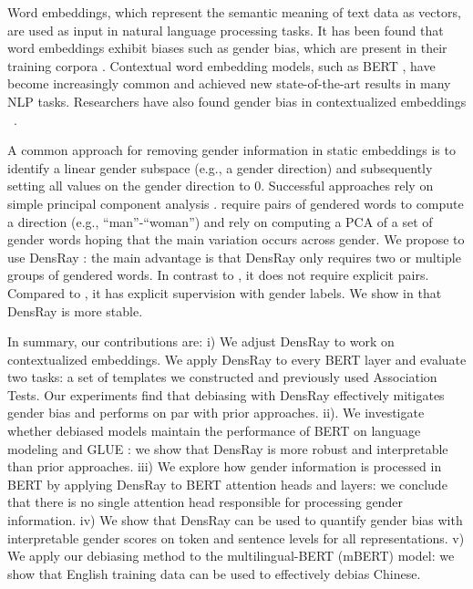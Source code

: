 Word embeddings, which represent the semantic meaning of
text data as vectors, are used as input in natural language
processing tasks. It has been found that word embeddings
exhibit biases such as gender bias, which are present in their training
corpora \cite{bolukbasi2016man,caliskan2017semantics,garg2018word}. Contextual word
embedding models, such as BERT \cite{devlin2018bert}, have
become increasingly common and achieved new state-of-the-art
results in many NLP tasks. Researchers have also found
gender bias in contextualized
embeddings ~\cite{zhao2019gender,may2019measuring}.

A common approach for removing gender information in static
embeddings is to identify a linear gender subspace (e.g., a
gender direction) and subsequently setting all values on the
gender direction to 0. Successful approaches rely on simple
principal component
analysis \cite{bolukbasi2016man,mu2018all}. 
require pairs of gendered words to compute a direction
(e.g., ``man''-``woman'') and  rely on
computing a PCA of a set of gender words hoping that the
main variation occurs across gender. We propose to use
DensRay \cite{dufter2019analytical}: the main advantage is
that DensRay only requires two or multiple groups of
gendered words. In contrast to \cite{bolukbasi2016man}, it
does not require explicit pairs. Compared
to \cite{mu2018all}, it has explicit supervision with gender
labels. We show in  that
DensRay is more stable.

In summary, our contributions are: 
i) We adjust DensRay to work on contextualized embeddings.
We apply DensRay to every BERT layer and evaluate two tasks:
a set of templates we constructed and previously used Association Tests. Our experiments find that debiasing with DensRay effectively mitigates gender bias and performs on par with prior approaches. 
ii). We investigate whether debiased models maintain the performance of BERT on language modeling and GLUE \cite{wang2018glue}: we show that DensRay is more robust and interpretable than prior approaches.
iii) We explore how gender information is processed in BERT by applying DensRay to BERT attention heads and layers: we conclude that there is no single attention head responsible for processing gender information.
iv) We show that DensRay can be used to quantify gender bias with interpretable gender scores on token and sentence levels for all representations. 
v) We apply our debiasing method to the multilingual-BERT (mBERT) model: we show that English training data can be used to effectively debias Chinese.

